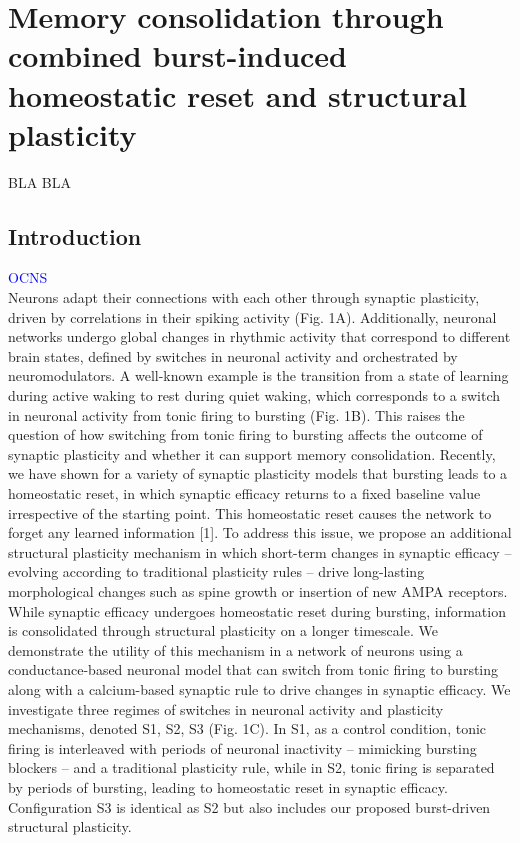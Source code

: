 \chapter{Memory consolidation through combined burst-induced homeostatic reset and structural plasticity}
\begin{shaded}
BLA BLA

\end{shaded}

%
%
\section{Introduction}
\textcolor{blue}{OCNS}\\
Neurons adapt their connections with each other through synaptic plasticity, driven by correlations in their spiking activity (Fig. 1A). Additionally, neuronal networks undergo global changes in rhythmic activity that correspond to different brain states, defined by switches in neuronal activity and orchestrated by neuromodulators. A well-known example is the transition from a state of learning during active waking to rest during quiet waking, which corresponds to a switch in neuronal activity from tonic firing to bursting (Fig. 1B). This raises the question of how switching from tonic firing to bursting affects the outcome of synaptic plasticity and whether it can support memory consolidation.
Recently, we have shown for a variety of synaptic plasticity models that bursting leads to a homeostatic reset, in which synaptic efficacy returns to a fixed baseline value irrespective of the starting point. This homeostatic reset causes the network to forget any learned information [1]. To address this issue, we propose an additional structural plasticity mechanism in which short-term changes in synaptic efficacy – evolving according to traditional plasticity rules – drive long-lasting morphological changes such as spine growth or insertion of new AMPA receptors. While synaptic efficacy undergoes homeostatic reset during bursting, information is consolidated through structural plasticity on a longer timescale.
We demonstrate the utility of this mechanism in a network of neurons using a conductance-based neuronal model that can switch from tonic firing to bursting along with a calcium-based synaptic rule to drive changes in synaptic efficacy. We investigate three regimes of switches in neuronal activity and plasticity mechanisms, denoted S1, S2, S3 (Fig. 1C). In S1, as a control condition, tonic firing is interleaved with periods of neuronal inactivity – mimicking bursting blockers – and a traditional plasticity rule, while in S2, tonic firing is separated by periods of bursting, leading to homeostatic reset in synaptic efficacy. Configuration S3 is identical as S2 but also includes our proposed burst-driven structural plasticity. 
